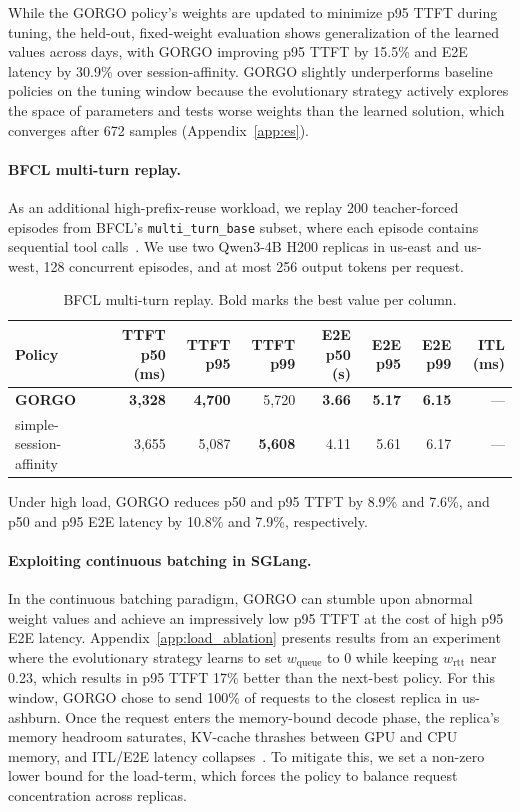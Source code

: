 \documentclass{article}
\begin{document}
While the GORGO policy's weights are
updated to minimize p95 TTFT during tuning, the held-out, fixed-weight evaluation
shows generalization of the learned values across days, with GORGO improving p95
TTFT by 15.5\% and E2E latency by 30.9\% over session-affinity. GORGO
slightly underperforms baseline policies on the tuning window because the
evolutionary strategy actively explores the space of parameters and tests worse weights than the learned solution, which converges after 672 samples
(Appendix~\ref{app:es}).

\paragraph{BFCL multi-turn replay.}
As an additional high-prefix-reuse workload, we replay 200 teacher-forced
episodes from BFCL's \texttt{multi\_turn\_base} subset, where each episode
contains sequential tool calls~\citep{patil2025bfcl}. We use two Qwen3-4B H200
replicas in us-east and us-west, 128 concurrent episodes, and at most 256 output
tokens per request.

\begin{table}[ht]
\centering
\small
\caption{BFCL multi-turn replay. Bold marks the best value per column.}
\label{tab:bfcl}
\setlength{\tabcolsep}{2.7pt}
\begin{tabular}{lrrrrrrr}
\toprule
Policy & TTFT p50 (ms) & TTFT p95 & TTFT p99 & E2E p50 (s) & E2E p95 & E2E p99 & ITL (ms) \\
\midrule
\textbf{GORGO}          & \textbf{3{,}328} & \textbf{4{,}700} & 5{,}720          & \textbf{3.66} & \textbf{5.17} & \textbf{6.15} & --- \\
simple-session-affinity & 3{,}655          & 5{,}087          & \textbf{5{,}608} & 4.11          & 5.61          & 6.17          & --- \\
\bottomrule
\end{tabular}
\end{table}

Under high load, GORGO reduces p50 and p95 TTFT by 8.9\% and 7.6\%, and p50
and p95 E2E latency by 10.8\% and 7.9\%, respectively.

\paragraph{Exploiting continuous batching in SGLang.}
In the continuous batching paradigm, GORGO can stumble upon abnormal weight values and achieve an impressively low p95 TTFT at the cost of high p95 E2E latency.
Appendix~\ref{app:load_ablation} presents results from an experiment where the evolutionary strategy learns to set $w_{\mathrm{queue}}$
to 0 while keeping $w_{\mathrm{rtt}}$ near 0.23, which results in p95 TTFT 17\% better than the next-best policy. For this window,
GORGO chose to send 100\% of requests to the closest replica in us-ashburn. Once the request enters the memory-bound decode phase, the replica's memory headroom saturates, KV-cache thrashes between GPU and CPU memory, and ITL/E2E latency collapses~\citep{orca2022, vllm2023}.
To mitigate this, we set a non-zero lower bound for the load-term, which forces the policy to balance request concentration across replicas.
\end{document}
